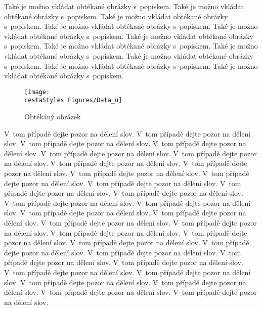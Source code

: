 Ta\-ké je možno vkládat obtékané obrázky s~popiskem. Ta\-ké je možno vkládat obtékané obrázky s~popiskem. Ta\-ké je možno vkládat obtékané obrázky s~popiskem. Ta\-ké je možno vkládat obtékané obrázky s~popiskem. Ta\-ké je možno vkládat obtékané obrázky s~popiskem. Ta\-ké je možno vkládat obtékané obrázky s~popiskem. Ta\-ké je možno vkládat obtékané obrázky s~popiskem. Ta\-ké je možno vkládat obtékané obrázky s~popiskem. Ta\-ké je možno vkládat obtékané obrázky s~popiskem. Ta\-ké je možno vkládat obtékané obrázky s~popiskem. Ta\-ké je možno vkládat obtékané obrázky
s~popiskem.

\begin{wrapfigure}[13]{i}{6.5cm}
\begin{center}
  \texttt{[image: \\cestaStyles Figures/Data\_u]}
  \caption{Obtékáný obrázek}
  \label{fig:Data_u2}
\end{center}
\end{wrapfigure}
V~tom pří\-pa\-dě dej\-te po\-zor na dě\-le\-ní slov. V~tom pří\-pa\-dě dej\-te po\-zor na dě\-le\-ní slov. V~tom pří\-pa\-dě dej\-te po\-zor na dě\-le\-ní slov. V~tom pří\-pa\-dě dej\-te po\-zor na dě\-le\-ní slov. V~tom pří\-pa\-dě dej\-te po\-zor na dě\-le\-ní slov. V~tom pří\-pa\-dě dej\-te po\-zor na dě\-le\-ní slov. V~tom pří\-pa\-dě dej\-te po\-zor na dě\-le\-ní slov. V~tom pří\-pa\-dě dej\-te po\-zor na dě\-le\-ní slov. V~tom pří\-pa\-dě dej\-te po\-zor na dě\-le\-ní slov. V~tom pří\-pa\-dě dej\-te po\-zor na dě\-le\-ní slov. V~tom pří\-pa\-dě dej\-te po\-zor na dě\-le\-ní slov. V~tom pří\-pa\-dě dej\-te po\-zor na dě\-le\-ní slov. V~tom pří\-pa\-dě dej\-te po\-zor na dě\-le\-ní slov. V~tom pří\-pa\-dě dej\-te po\-zor na dě\-le\-ní slov. V~tom pří\-pa\-dě dej\-te po\-zor na dě\-le\-ní slov. V~tom pří\-pa\-dě dej\-te po\-zor na dě\-le\-ní slov. V~tom pří\-pa\-dě dej\-te po\-zor na dě\-le\-ní slov. V~tom pří\-pa\-dě dej\-te po\-zor na dě\-le\-ní slov. V~tom pří\-pa\-dě dej\-te po\-zor na dě\-le\-ní slov. V~tom pří\-pa\-dě dej\-te po\-zor na dě\-le\-ní slov. V~tom pří\-pa\-dě dej\-te po\-zor na dě\-le\-ní slov. V~tom pří\-pa\-dě dej\-te po\-zor na dě\-le\-ní slov. V~tom pří\-pa\-dě dej\-te po\-zor na dě\-le\-ní slov. V~tom pří\-pa\-dě dej\-te po\-zor na dě\-le\-ní slov. V~tom pří\-pa\-dě dej\-te po\-zor na dě\-le\-ní slov. V~tom pří\-pa\-dě dej\-te po\-zor na dě\-le\-ní slov. V~tom pří\-pa\-dě dej\-te po\-zor na dě\-le\-ní slov. V~tom pří\-pa\-dě dej\-te po\-zor na dě\-le\-ní slov. V~tom pří\-pa\-dě dej\-te po\-zor na dě\-le\-ní slov. V~tom pří\-pa\-dě dej\-te po\-zor na dě\-le\-ní slov. V~tom pří\-pa\-dě dej\-te po\-zor na dě\-le\-ní slov. V~tom pří\-pa\-dě dej\-te po\-zor na dě\-le\-ní slov.


